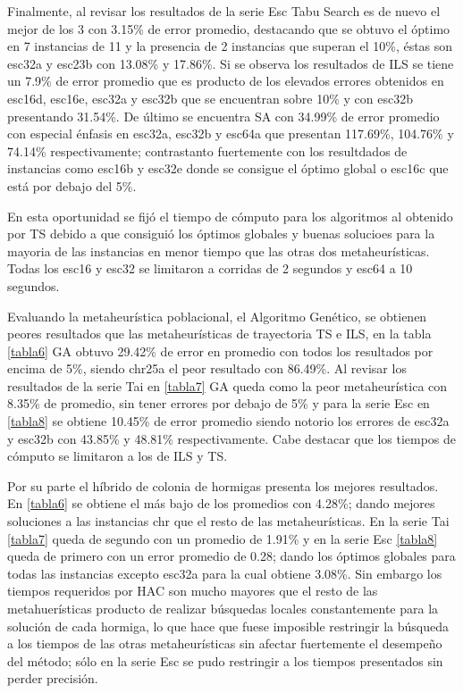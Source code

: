 \documentclass{ci5652}
\begin{document}
Finalmente, al revisar los resultados de la serie Esc Tabu Search es de nuevo el mejor de los 3 con 3.15\% de error promedio, destacando que se obtuvo el óptimo en 7 instancias de 11 y la presencia de 2 instancias que superan el 10\%, éstas son esc32a y esc23b con 13.08\% y 17.86\%. Si se observa los resultados de ILS se tiene un 7.9\% de error promedio que es producto de los elevados errores obtenidos en esc16d, esc16e, esc32a y esc32b que se encuentran sobre 10\% y con esc32b presentando 31.54\%. De último se encuentra SA con 34.99\% de error promedio con especial énfasis en esc32a, esc32b y esc64a que presentan 117.69\%, 104.76\% y 74.14\% respectivamente; contrastanto fuertemente con los resultdados de instancias como esc16b y esc32e donde se consigue el óptimo global o esc16c que está por debajo del 5\%.

En esta oportunidad se fijó el tiempo de cómputo para los algoritmos al obtenido por TS debido a que consiguió los óptimos globales y buenas solucioes para la mayoria de las instancias en menor tiempo que las otras dos metaheurísticas. Todas los esc16 y esc32 se limitaron a corridas de 2 segundos y esc64 a 10 segundos.

Evaluando la metaheurística poblacional, el Algoritmo Genético, se obtienen peores resultados que las metaheurísticas de trayectoria TS e ILS, en la tabla \ref{tabla6} GA obtuvo 29.42\% de error en promedio con todos los resultados por encima de 5\%, siendo chr25a el peor resultado con 86.49\%. Al revisar los resultados de la serie Tai en \ref{tabla7} GA queda como la peor metaheurística con 8.35\% de promedio, sin tener errores por debajo de 5\% y para la serie Esc en \ref{tabla8} se obtiene 10.45\% de error promedio siendo notorio los errores de esc32a y esc32b con 43.85\% y 48.81\% respectivamente. Cabe destacar que los tiempos de cómputo se limitaron a los de ILS y TS.

Por su parte el híbrido de colonia de hormigas presenta los mejores resultados. En \ref{tabla6} se obtiene el más bajo de los promedios con 4.28\%; dando mejores soluciones a las instancias chr que el resto de las metaheurísticas. En la serie Tai \ref{tabla7} queda de segundo con un promedio de 1.91\% y en la serie Esc \ref{tabla8} queda de primero con un error promedio de 0.28; dando los óptimos globales para todas las instancias excepto esc32a para la cual obtiene 3.08\%. Sin embargo los tiempos requeridos por HAC son mucho mayores que el resto de las metahuerísticas producto de realizar búsquedas locales constantemente para la solución de cada hormiga, lo que hace que fuese imposible restringir la búsqueda a los tiempos de las otras metaheurísticas sin afectar fuertemente el desempeño del método; sólo en la serie Esc se pudo restringir a los tiempos presentados sin perder precisión.
\end{document}
